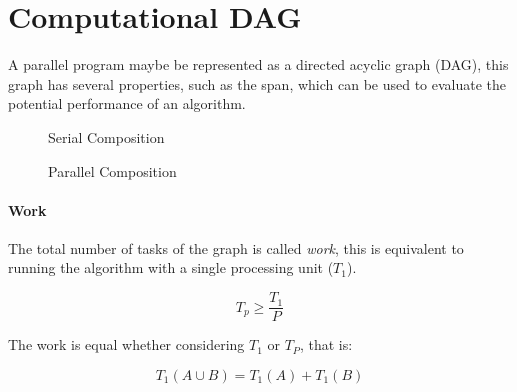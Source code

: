 
\section{Computational DAG}

A parallel program maybe be represented as a directed acyclic graph (DAG),
this graph has several properties, such as the span,
which can be used to evaluate the potential performance of an algorithm.

\begin{figure}
    \centering
    \caption{Serial Composition}
    \label{fig:dag:serial}
\end{figure}


\begin{figure}
    \centering
    \caption{Parallel Composition}
    \label{fig:dag:parallel}
\end{figure}

\paragraph{Work}

The total number of tasks of the graph is called \textit{work},
this is equivalent to running the algorithm with a single processing unit ($T_1$).

\begin{equation}\label{eq:work_law}
    T_p \ge \frac{T_1}{P}
\end{equation}

The work is equal whether considering $T_1$ or $T_P$,
that is:

\begin{equation}
    T_1 (A \cup B) = T_1(A) + T_1(B)
\end{equation}

